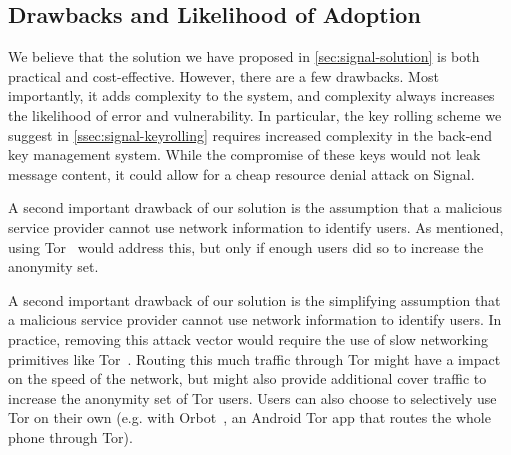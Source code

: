 


\subsection{Drawbacks and Likelihood of Adoption}

We believe that the solution we have proposed in \cref{sec:signal-solution}
is both practical and cost-effective.  However, there are a few drawbacks.
Most importantly, it adds complexity to the system, and complexity always increases the
likelihood of error and vulnerability.  In particular, the key rolling scheme
we suggest in \cref{ssec:signal-keyrolling} requires increased complexity in
the back-end key management system.  While the compromise of these keys would
not leak message content, it could allow for a cheap resource denial attack on
Signal.

A second important drawback of our solution is the assumption that a malicious
service provider cannot use network information to identify users. As mentioned,
using Tor~\cite{tor_two,guardianproject} would address this, but only if enough
users did so to increase the anonymity set.

A second important drawback of our solution is the simplifying assumption that
a malicious service provider cannot use network information to identify users.
In practice, removing this attack vector would require the use of slow
networking primitives like Tor~\cite{tor_two}.  Routing this much traffic through Tor might
have a impact on the speed of the network, but might also provide additional cover 
traffic to increase the anonymity set of Tor users. Users can also choose to
selectively use Tor on their own (e.g. with Orbot~\cite{guardianproject}, an Android Tor app that
routes the whole phone through Tor).
\fi


